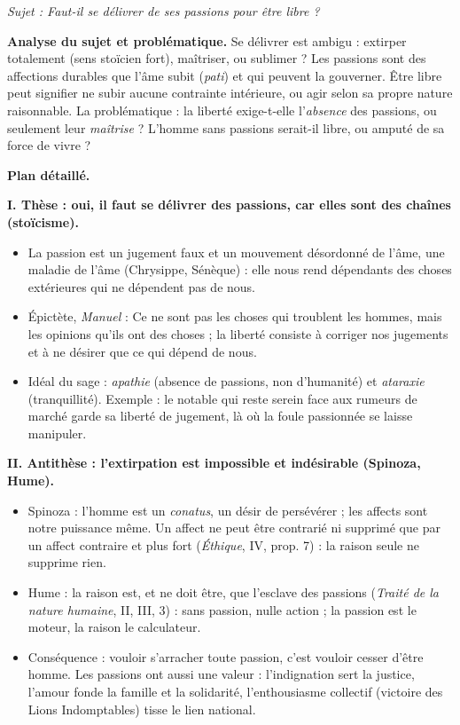 \documentclass[11pt]{article}
\begin{document}
\begin{corrige}

\emph{Sujet : Faut-il se délivrer de ses passions pour être libre ?}

\textbf{Analyse du sujet et problématique.} \guillemotleft Se délivrer \guillemotright{} est ambigu : extirper totalement (sens stoïcien fort), maîtriser, ou sublimer ? Les \guillemotleft passions \guillemotright{} sont des affections durables que l'âme subit (\emph{pati}) et qui peuvent la gouverner. Être \guillemotleft libre \guillemotright{} peut signifier ne subir aucune contrainte intérieure, ou agir selon sa propre nature raisonnable. La problématique : la liberté exige-t-elle l'\emph{absence} des passions, ou seulement leur \emph{maîtrise} ? L'homme sans passions serait-il libre, ou amputé de sa force de vivre ?

\textbf{Plan détaillé.}

\textbf{I. Thèse : oui, il faut se délivrer des passions, car elles sont des chaînes (stoïcisme).}
\begin{itemize}
\item La passion est un jugement faux et un mouvement désordonné de l'âme, une maladie de l'âme (Chrysippe, Sénèque) : elle nous rend dépendants des choses extérieures qui ne dépendent pas de nous.
\item Épictète, \emph{Manuel} : \guillemotleft Ce ne sont pas les choses qui troublent les hommes, mais les opinions qu'ils ont des choses \guillemotright{} ; la liberté consiste à corriger nos jugements et à ne désirer que ce qui dépend de nous.
\item Idéal du sage : \emph{apathie} (absence de passions, non d'humanité) et \emph{ataraxie} (tranquillité). Exemple : le notable qui reste serein face aux rumeurs de marché garde sa liberté de jugement, là où la foule passionnée se laisse manipuler.
\end{itemize}

\textbf{II. Antithèse : l'extirpation est impossible et indésirable (Spinoza, Hume).}
\begin{itemize}
\item Spinoza : l'homme est un \emph{conatus}, un désir de persévérer ; les affects sont notre puissance même. \guillemotleft Un affect ne peut être contrarié ni supprimé que par un affect contraire et plus fort \guillemotright{} (\emph{Éthique}, IV, prop. 7) : la raison seule ne supprime rien.
\item Hume : \guillemotleft la raison est, et ne doit être, que l'esclave des passions \guillemotright{} (\emph{Traité de la nature humaine}, II, III, 3) : sans passion, nulle action ; la passion est le moteur, la raison le calculateur.
\item Conséquence : vouloir s'arracher toute passion, c'est vouloir cesser d'être homme. Les passions ont aussi une valeur : l'indignation sert la justice, l'amour fonde la famille et la solidarité, l'enthousiasme collectif (victoire des Lions Indomptables) tisse le lien national.
\end{itemize}


\end{corrige}
\end{document}
